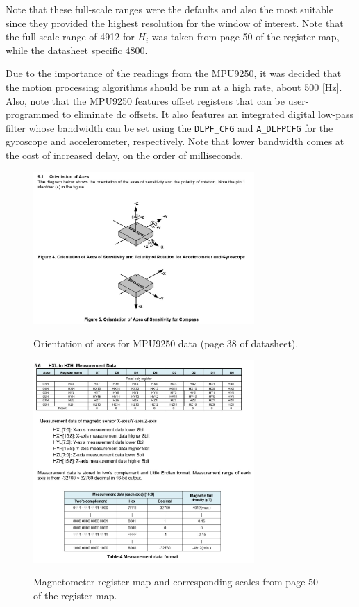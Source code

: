 \documentclass{article}
\begin{document}
Note that these full-scale ranges were the defaults and also the most suitable since they provided the highest resolution for the window of interest. Note that the full-scale range of 4912 for $H_i$ was taken from page 50 of the register map, while the datasheet specific 4800.
\newline
\newline

Due to the importance of the readings from the MPU9250, it was decided that the motion processing algorithms should be run at a high rate, about 500 [Hz]. Also, note that the MPU9250 features offset registers that can be user-programmed to eliminate dc offsets. It also features an integrated digital low-pass filter whose bandwidth can be set using the \texttt{DLPF\_CFG} and \texttt{A\_DLFPCFG} for the gyroscope and accelerometer, respectively. Note that lower bandwidth comes at the cost of increased delay, on the order of milliseconds.

\begin{figure}
	\centering
	\includegraphics[width=0.75\textwidth]{images/MPU9250_axisOrientation}
	\label{MPUAxisOrientation}
	\caption{Orientation of axes for MPU9250 data (page 38 of datasheet).}
\end{figure}


\begin{figure}
	\centering
	\includegraphics[width=0.75\textwidth]{images/MPU9250_magnetometerRegs}
	\label{MPUMagRegs}
	\caption{Magnetometer register map and corresponding scales from page 50 of the register map.}
\end{figure}
\end{document}
